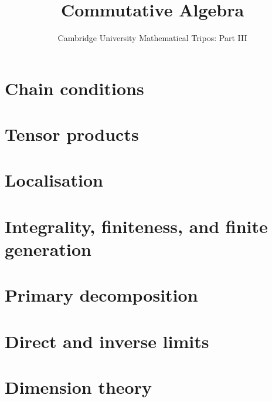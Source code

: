 \documentclass{article}
\title{Commutative Algebra}
\author{Cambridge University Mathematical Tripos: Part III}
\begin{document}
\maketitle

\tableofcontentsnewpage{}

\section{Chain conditions}

\section{Tensor products}

\section{Localisation}

\section{Integrality, finiteness, and finite generation}

\section{Primary decomposition}

\section{Direct and inverse limits}

\section{Dimension theory}

\end{document}
